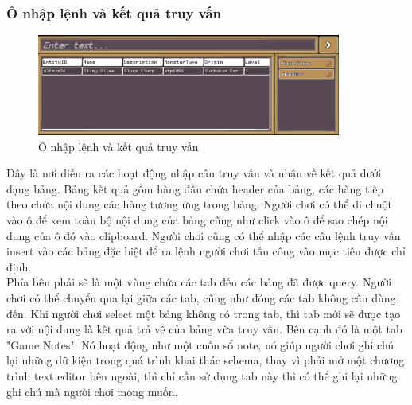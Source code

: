 \subsubsection{Ô nhập lệnh và kết quả truy vấn}
\begin{figure}[H]
	\centering
	\includegraphics[width=10cm]{Images/CommandBox.png}
	\vspace{0.5cm}
	\caption{Ô nhập lệnh và kết quả truy vấn}
\end{figure}
\hspace*{1cm} Đây là nơi diễn ra các hoạt động nhập câu truy vấn và nhận về kết quả dưới dạng bảng. Bảng kết quả gồm hàng đầu chứa header của bảng, các hàng tiếp theo chứa nội dung các hàng tương ứng trong bảng. Người chơi có thể di chuột vào ô để xem toàn bộ nội dung của bảng cũng như click vào ô để sao chép nội dung của ô đó vào clipboard. Người chơi cũng có thể nhập các câu lệnh truy vấn insert vào các bảng đặc biệt để ra lệnh người chơi tấn công vào mục tiêu được chỉ định.\\
\hspace*{1cm} Phía bên phải sẽ là một vùng chứa các tab đến các bảng đã được query. Người chơi có thể chuyển qua lại giữa các tab, cũng như đóng các tab không cần dùng đến. Khi người chơi select một bảng không có trong tab, thì tab mới sẽ được tạo ra với nội dung là kết quả trả về của bảng vừa truy vấn.
\hspace*{1cm} Bên cạnh đó là một tab "Game Notes". Nó hoạt động như một cuốn sổ note, nó giúp người chơi ghi chú lại những dữ kiện trong quá trình khai thác schema, thay vì phải mở một chương trình text editor bên ngoài, thì chỉ cần sử dụng tab này thì có thể ghi lại những ghi chú mà người chơi mong muốn.
